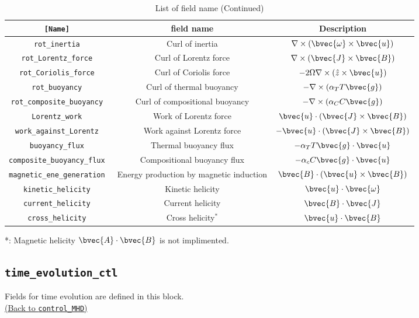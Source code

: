 \begin{table}[htp]
\caption{List of field name (Continued)}
\begin{center}
\begin{tabular}{|c|c|c|}
\hline
\tt [Name] & field name & Description \\ \hline \hline
\tt rot\_inertia & Curl of inertia &  $ \nabla \times \left(\bvec{\omega} \times \bvec{u}\right) $ \\
\tt rot\_Lorentz\_force & Curl of Lorentz force &  $ \nabla \times \left(\bvec{J} \times \bvec{B}\right) $ \\
\tt rot\_Coriolis\_force & Curl of Coriolis force &  $ -2 \Omega \nabla \times \left(\hat{z} \times \bvec{u} \right) $ \\
\tt rot\_buoyancy                   & Curl of thermal buoyancy &  $ - \nabla \times \left(\alpha_{T} T \bvec{g}\right)  $ \\
\tt rot\_composite\_buoyancy & Curl of compositional buoyancy &  $ - \nabla \times \left(\alpha_{C} C\bvec{g}\right)  $\\
\hline
\tt Lorentz\_work & Work of Lorentz force
 & $\bvec{u}\cdot \left( \bvec{J} \times \bvec{B} \right) $ \\ 
\tt work\_against\_Lorentz & Work against Lorentz force
 & $- \bvec{u}\cdot \left( \bvec{J} \times \bvec{B} \right) $ \\ 
\tt buoyancy\_flux & Thermal buoyancy flux & $ -\alpha_{T} T \bvec{g} \cdot \bvec{u} $ \\
\tt composite\_buoyancy\_flux & Compositional buoyancy flux & $ -\alpha_{c} C \bvec{g} \cdot \bvec{u} $ \\
\tt magnetic\_ene\_generation & Energy production by magnetic induction
 & $  \bvec{B} \cdot \left( \bvec{u} \times \bvec{B} \right) $ \\ 
\hline
\tt kinetic\_helicity & Kinetic helicity & $  \bvec{u} \cdot \bvec{\omega} $ \\
\tt current\_helicity & Current helicity & $  \bvec{B} \cdot \bvec{J} $ \\
\tt cross\_helicity & Cross helicity$^{*}$ & $  \bvec{u} \cdot \bvec{B} $ \\
\hline
\end{tabular}
\end{center}
*: Magnetic helicity $\bvec{A} \cdot \bvec{B} $ is not implimented.
\label{table:fields2}
\end{table}
%

\subsection{\tt time\_evolution\_ctl}
\label{href_t:time_evolution_ctl}
Fields for time evolution are defined in this block. \\
\hyperref[href_i:time_evolution_ctl]{(Back to {\tt control\_MHD})}

